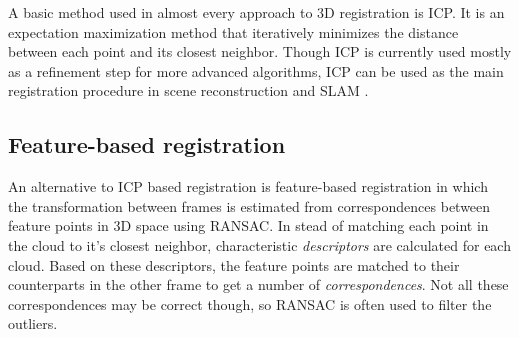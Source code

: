 \documentclass[a4paper]{article}
\begin{document}
A basic method used in almost every approach to 3D registration is \ac{ICP}\cite{besl1992method}. It is an expectation maximization method that iteratively minimizes the distance between each point and its closest neighbor. Though \ac{ICP} is currently used mostly as a refinement step for more advanced algorithms, \ac{ICP} can be used as the main registration procedure in scene reconstruction \cite{izadi2011kinectfusion,newcombe2011kinectfusion} and \ac{SLAM} \cite{nuchter20076d}.




\subsection{Feature-based registration}

An alternative to \ac{ICP} based registration is feature-based registration in which the transformation between frames is estimated from correspondences between feature points in 3D space using \ac{RANSAC}. In stead of matching each point in the cloud to it's closest neighbor, characteristic \emph{descriptors} are calculated for each cloud. Based on these descriptors, the feature points are matched to their counterparts in the other frame to get a number of \emph{correspondences}. Not all these correspondences may be correct though, so \ac{RANSAC} is often used to filter the outliers. 
\end{document}
